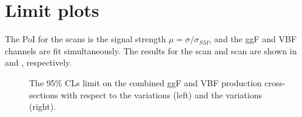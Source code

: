 \section{Limit plots}

The PoI for the scans is the signal strength $\mu = \sigma / \sigma_{SM}$, and the ggF and VBF channels are fit simultaneously.
The results for the \kl scan and \kvv scan are shown in \Fig{\ref{fig:comb_kl_scan}} and \Fig{\ref{fig:k2v-comb}}, respectively.

\begin{figure}[h]
	\caption{The 95\% CLs limit on the combined ggF and VBF \HH production cross-sections with respect to the \kl variations (left) and the \kvv variations (right).}
	\label{fig:comb-scans}
\end{figure}

